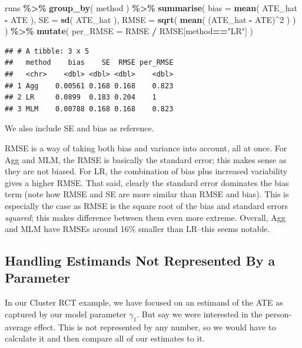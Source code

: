 \documentclass[
]{book}
\newenvironment{Shaded}{\begin{snugshade}}{\end{snugshade}}
\newcommand{\AttributeTok}[1]{\textcolor[rgb]{0.13,0.29,0.53}{#1}}
\newcommand{\DecValTok}[1]{\textcolor[rgb]{0.00,0.00,0.81}{#1}}
\newcommand{\FunctionTok}[1]{\textcolor[rgb]{0.13,0.29,0.53}{\textbf{#1}}}
\newcommand{\NormalTok}[1]{#1}
\newcommand{\SpecialCharTok}[1]{\textcolor[rgb]{0.81,0.36,0.00}{\textbf{#1}}}
\newcommand{\StringTok}[1]{\textcolor[rgb]{0.31,0.60,0.02}{#1}}
\begin{document}
\begin{Shaded}
\begin{Highlighting}[]
\NormalTok{runs }\SpecialCharTok{\%\textgreater{}\%} 
  \FunctionTok{group\_by}\NormalTok{( method ) }\SpecialCharTok{\%\textgreater{}\%}
  \FunctionTok{summarise}\NormalTok{( }
    \AttributeTok{bias =} \FunctionTok{mean}\NormalTok{( ATE\_hat }\SpecialCharTok{{-}}\NormalTok{ ATE ),}
    \AttributeTok{SE =} \FunctionTok{sd}\NormalTok{( ATE\_hat ),}
    \AttributeTok{RMSE =} \FunctionTok{sqrt}\NormalTok{( }\FunctionTok{mean}\NormalTok{( (ATE\_hat }\SpecialCharTok{{-}}\NormalTok{ ATE)}\SpecialCharTok{\^{}}\DecValTok{2}\NormalTok{ ) )}
\NormalTok{  ) }\SpecialCharTok{\%\textgreater{}\%}
  \FunctionTok{mutate}\NormalTok{( }\AttributeTok{per\_RMSE =}\NormalTok{ RMSE }\SpecialCharTok{/}\NormalTok{ RMSE[method}\SpecialCharTok{==}\StringTok{"LR"}\NormalTok{] )}
\end{Highlighting}
\end{Shaded}

\begin{verbatim}
## # A tibble: 3 x 5
##   method    bias    SE  RMSE per_RMSE
##   <chr>    <dbl> <dbl> <dbl>    <dbl>
## 1 Agg    0.00561 0.168 0.168    0.823
## 2 LR     0.0899  0.183 0.204    1    
## 3 MLM    0.00788 0.168 0.168    0.823
\end{verbatim}

We also include SE and bias as reference.

RMSE is a way of taking both bias and variance into account, all at once.
For Agg and MLM, the RMSE is basically the standard error; this makes sense as they are not biased.
For LR, the combination of bias plus increased variability gives a higher RMSE.
That said, clearly the standard error dominates the bias term (note how RMSE and SE are more similar than RMSE and bias).
This is especially the case as RMSE is the square root of the bias and standard errors \emph{squared}; this makes difference between them even more extreme.
Overall, Agg and MLM have RMSEs around 16\% smaller than LR--this seems notable.

\subsection{Handling Estimands Not Represented By a Parameter}\label{handling-estimands-not-represented-by-a-parameter}

In our Cluster RCT example, we have focused on an estimand of the ATE as captured by our model parameter \(\gamma_1\).
But say we were interested in the person-average effect.
This is not represented by any number, so we would have to calculate it and then compare all of our estimates to it.
\end{document}
